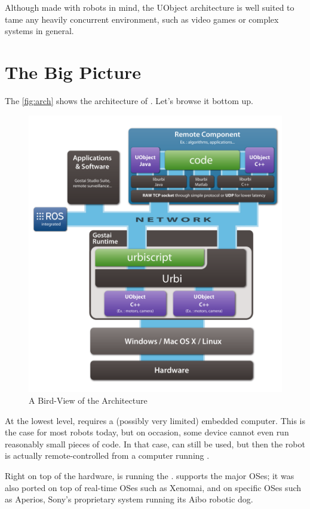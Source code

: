 Although made with robots in mind, the UObject architecture is well suited
to tame any heavily concurrent environment, such as video games or complex
systems in general.

\section{The Big Picture}

The \autoref{fig:arch} shows the architecture of \urbi.  Let's browse it
bottom up.

\begin{figure}[p]
  \centering
  \includegraphics[width=\linewidth]{img/urbi-architecture}
  \caption{A Bird-View of the \urbi Architecture}
  \label{fig:arch}
\end{figure}

At the lowest level, \urbi requires a (possibly very limited) embedded
computer.  This is the case for most robots today, but on occasion, some
device cannot even run reasonably small pieces of code.  In that case, \urbi
can still be used, but then the robot is actually remote-controlled from a
computer running \urbi.

Right on top of the hardware, is running the .  \urbi
supports the major OSes; it was also ported on top of real-time OSes such as
Xenomai, and on specific OSes such as Aperios, Sony's proprietary system
running its Aibo robotic dog.


